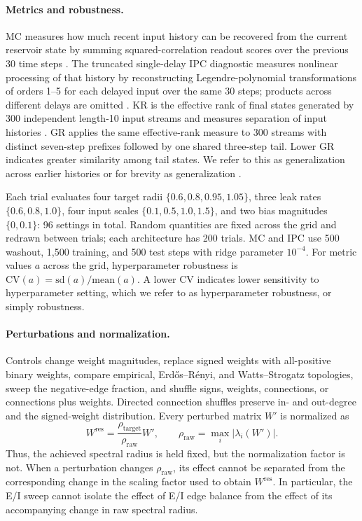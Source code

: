 \documentclass[mlabstract,onecolumn]{jmlr}
\begin{document}
\paragraph{Metrics and robustness.}
MC measures how much recent input history can be recovered from the current reservoir state by summing squared-correlation readout scores over the previous 30 time steps \citep{Jaeger2002STMESN}. The truncated single-delay IPC diagnostic measures nonlinear processing of that history by reconstructing Legendre-polynomial transformations of orders 1--5 for each delayed input over the same 30 steps; products across different delays are omitted \citep{dambre_ipc_2012}. KR is the effective rank of final states generated by 300 independent length-10 input streams and measures separation of input histories \citep{legenstein_maass_2007,roy_effective_rank_2007}. GR applies the same effective-rank measure to 300 streams with distinct seven-step prefixes followed by one shared three-step tail. Lower GR indicates greater similarity among tail states. We refer to this as generalization across earlier histories or for brevity as generalization \citep{vidamour_quantifying_2022}.

Each trial evaluates four target radii $\{0.6,0.8,0.95,1.05\}$, three leak rates $\{0.6,0.8,1.0\}$, four input scales $\{0.1,0.5,1.0,1.5\}$, and two bias magnitudes $\{0,0.1\}$: 96 settings in total. Random quantities are fixed across the grid and redrawn between trials; each architecture has 200 trials. MC and IPC use 500 washout, 1,500 training, and 500 test steps with ridge parameter $10^{-4}$. For metric values $a$ across the grid, hyperparameter robustness is $\mathrm{CV}(a)=\mathrm{sd}(a)/\mathrm{mean}(a)$. A lower CV indicates lower sensitivity to hyperparameter setting, which we refer to as hyperparameter robustness, or simply robustness.

\paragraph{Perturbations and normalization.}
Controls change weight magnitudes, replace signed weights with all-positive binary weights, compare empirical, Erd\H{o}s--R\'enyi, and Watts--Strogatz topologies, sweep the negative-edge fraction, and shuffle signs, weights, connections, or connections plus weights. Directed connection shuffles preserve in- and out-degree and the signed-weight distribution. Every perturbed matrix $W'$ is normalized as
\begin{equation}
W^{\mathrm{res}}=\frac{\rho_{\mathrm{target}}}{\rho_{\mathrm{raw}}}W',
\qquad \rho_{\mathrm{raw}}=\max_i|\lambda_i(W')|.
\label{eq:normalization}
\end{equation}
Thus, the achieved spectral radius is held fixed, but the normalization factor is not. When a perturbation changes $\rho_{\mathrm{raw}}$, its effect cannot be separated from the corresponding change in the scaling factor used to obtain $W^{\mathrm{res}}$. In particular, the E/I sweep cannot isolate the effect of E/I edge balance from the effect of its accompanying change in raw spectral radius.
\end{document}
